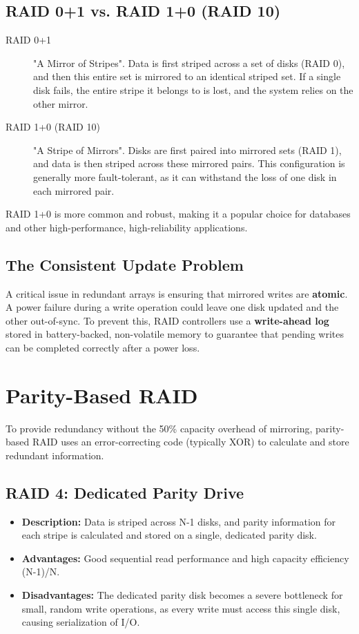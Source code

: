 \subsection{RAID 0+1 vs. RAID 1+0 (RAID 10)}
\begin{description}
    \item[RAID 0+1] "A Mirror of Stripes". Data is first striped across a set of disks (RAID 0), and then this entire set is mirrored to an identical striped set. If a single disk fails, the entire stripe it belongs to is lost, and the system relies on the other mirror.
    \item[RAID 1+0 (RAID 10)] "A Stripe of Mirrors". Disks are first paired into mirrored sets (RAID 1), and data is then striped across these mirrored pairs. This configuration is generally more fault-tolerant, as it can withstand the loss of one disk in each mirrored pair.
\end{description}
RAID 1+0 is more common and robust, making it a popular choice for databases and other high-performance, high-reliability applications.

\subsection{The Consistent Update Problem}
A critical issue in redundant arrays is ensuring that mirrored writes are \textbf{atomic}. A power failure during a write operation could leave one disk updated and the other out-of-sync. To prevent this, RAID controllers use a \textbf{write-ahead log} stored in battery-backed, non-volatile memory to guarantee that pending writes can be completed correctly after a power loss.

\section{Parity-Based RAID}
To provide redundancy without the 50\% capacity overhead of mirroring, parity-based RAID uses an error-correcting code (typically XOR) to calculate and store redundant information.

\subsection{RAID 4: Dedicated Parity Drive}
\begin{itemize}
    \item \textbf{Description:} Data is striped across N-1 disks, and parity information for each stripe is calculated and stored on a single, dedicated parity disk.
    \item \textbf{Advantages:} Good sequential read performance and high capacity efficiency (N-1)/N.
    \item \textbf{Disadvantages:} The dedicated parity disk becomes a severe bottleneck for small, random write operations, as every write must access this single disk, causing serialization of I/O.
\end{itemize}

